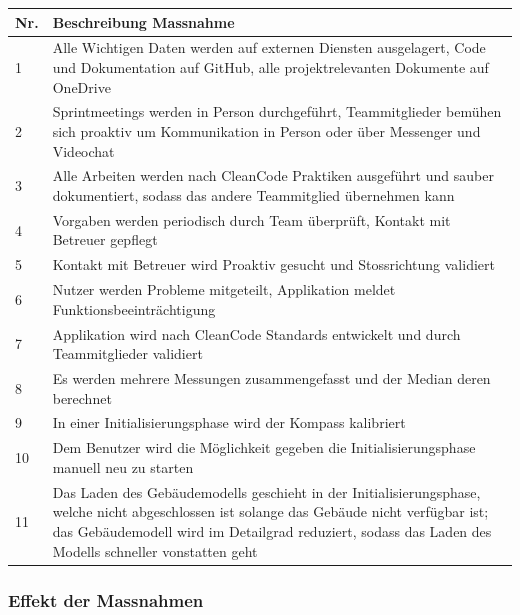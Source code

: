 \documentclass[a4paper]{scrreprt}
\begin{document}
\begin{tabularx}{\textwidth}{|l|X|}
	\hline
	\textbf{Nr.} & \textbf{Beschreibung Massnahme} \\
	\hline
	1 & Alle Wichtigen Daten werden auf externen Diensten ausgelagert, Code und Dokumentation auf GitHub, alle projektrelevanten Dokumente auf OneDrive\\
	\hline
	2 & Sprintmeetings werden in Person durchgeführt, Teammitglieder bemühen sich proaktiv um Kommunikation in Person oder über Messenger und Videochat\\
	\hline
	3 & Alle Arbeiten werden nach CleanCode Praktiken ausgeführt und sauber dokumentiert, sodass das andere Teammitglied übernehmen kann\\
	\hline
	4 & Vorgaben werden periodisch durch Team überprüft, Kontakt mit Betreuer gepflegt\\
	\hline
	5 & Kontakt mit Betreuer wird Proaktiv gesucht und Stossrichtung validiert\\
	\hline
	6 & Nutzer werden Probleme mitgeteilt, Applikation meldet Funktionsbeeinträchtigung\\
	\hline
	7 & Applikation wird nach CleanCode Standards entwickelt und durch Teammitglieder validiert\\
	\hline
	8 & Es werden mehrere Messungen zusammengefasst und der Median deren berechnet\\
	\hline
	9 & In einer Initialisierungsphase wird der Kompass kalibriert\\
	\hline
	10 & Dem Benutzer wird die Möglichkeit gegeben die Initialisierungsphase manuell neu zu starten\\
	\hline
	11 & Das Laden des Gebäudemodells geschieht in der Initialisierungsphase, welche nicht abgeschlossen ist solange das Gebäude nicht verfügbar ist; das Gebäudemodell wird im Detailgrad reduziert, sodass das Laden des Modells schneller vonstatten geht\\
	\hline
\end{tabularx}

\subsubsection{Effekt der Massnahmen}
\end{document}

